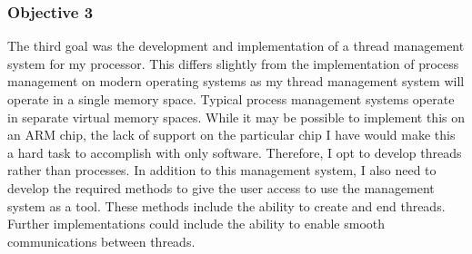 \subsubsection{Objective 3}
\label{obj3}
The third goal was the development and implementation of a thread management system for my processor. This differs slightly from the implementation of process management \cite{process} on modern operating systems as my thread management system will operate in a single memory space. Typical process management systems operate in separate virtual memory spaces. While it may be possible to implement this on an ARM chip, the lack of support on the particular chip I have would make this a hard task to accomplish with only software. Therefore, I opt to develop threads rather than processes. In addition to this management system, I also need to develop the required methods to give the user access to use the management system as a tool. These methods include the ability to create and end threads. Further implementations could include the ability to enable smooth communications between threads. 